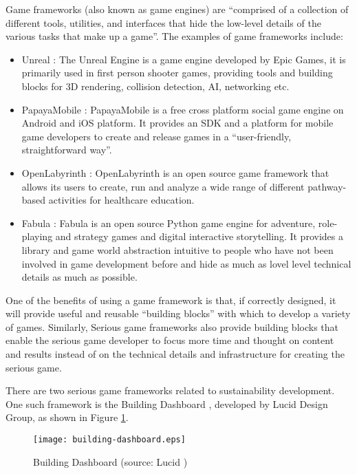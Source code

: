 Game frameworks (also known as game engines) \cite{sherrod2006ultimate} are ``comprised of a collection of different tools, utilities, and interfaces that hide the low-level details of the various tasks that make up a game''. The examples of game frameworks include:
\begin {itemize}
    \item Unreal \cite{unrealengine}:  The Unreal Engine is a game engine developed by Epic Games, it is primarily used in first person shooter games, providing tools and building blocks for 3D rendering, collision detection, AI, networking etc.
    \item PapayaMobile \cite{papayamobile}: PapayaMobile is a free cross platform social game engine on Android and iOS platform. It provides an SDK and a platform for mobile game developers to create and release games in a ``user-friendly, straightforward way''.
    \item OpenLabyrinth \cite{openlabyrinth}: OpenLabyrinth is an open source game framework that allows its users to create, run and analyze a wide range of different pathway-based activities for healthcare education.
    \item Fabula \cite{fabula}: Fabula is an open source Python game engine for adventure, role-playing and strategy games and digital interactive storytelling. It provides a library and game world abstraction intuitive to people who have not been involved in game development before and hide as much as lovel level technical details as much as possible.
\end {itemize}

One of the benefits of using a game framework is that, if correctly designed, it will provide useful and reusable ``building blocks'' with which to develop a variety of games. Similarly, Serious game frameworks also provide building blocks that enable the serious game developer to focus more time and thought on content and results instead of on the technical details and infrastructure for creating the serious game.

There are two serious game frameworks related to sustainability development. One such framework is the Building Dashboard \cite{building-dashboard}, developed by Lucid Design Group, as shown in Figure \ref{fig:building-dashboard}.

\begin{figure}[htbp]
	\centering
		\texttt{[image: building-dashboard.eps]}
		\caption{Building Dashboard (source: Lucid \cite{building-dashboard})}
		\label{fig:building-dashboard}
\end{figure}

